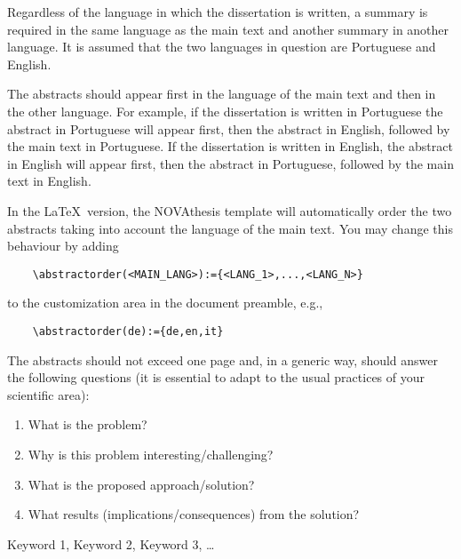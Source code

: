 

Regardless of the language in which the dissertation is written, a summary is required in the same language as the main text and another summary in another language. It is assumed that the two languages in question are Portuguese and English.

The abstracts should appear first in the language of the main text and then in the other language. For example, if the dissertation is written in Portuguese the abstract in Portuguese will appear first, then the abstract in English, followed by the main text in Portuguese. If the dissertation is written in English, the abstract in English will appear first, then the abstract in Portuguese, followed by the main text in English. 

In the \LaTeX\ version, the NOVAthesis template will automatically order the two abstracts taking into account the language of the main text. You may change this behaviour by adding
\begin{verbatim}
    \abstractorder(<MAIN_LANG>):={<LANG_1>,...,<LANG_N>}
\end{verbatim}
\noindent to the customization area in the document preamble, e.g.,
\begin{verbatim}
    \abstractorder(de):={de,en,it}
\end{verbatim}

The abstracts should not exceed one page and, in a generic way, should answer the following questions (it is essential to adapt to the usual practices of your scientific area):

\begin{enumerate}
  \item What is the problem?
  \item Why is this problem interesting/challenging?
  \item What is the proposed approach/solution?
  \item What results (implications/consequences) from the solution?
\end{enumerate}

\begin{keywords}
Keyword 1, Keyword 2, Keyword 3, …
\end{keywords} 
